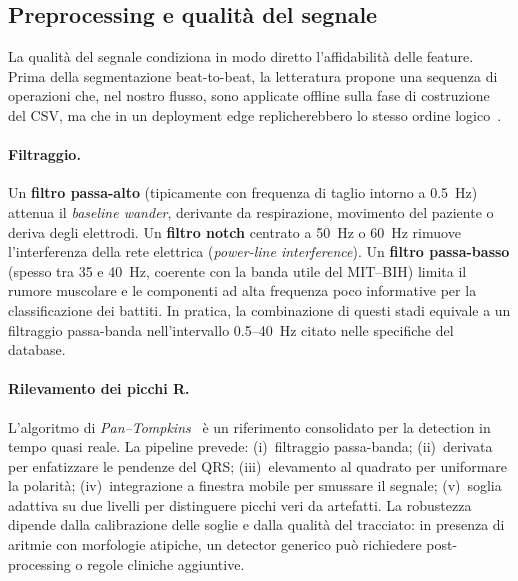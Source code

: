 \subsection{Preprocessing e qualità del segnale}\label{subsec:preprocessing}

La qualità del segnale condiziona in modo diretto l'affidabilità delle feature.
Prima della segmentazione beat-to-beat, la letteratura propone una sequenza di operazioni che, nel nostro flusso, sono applicate offline sulla fase di costruzione del CSV, ma che in un deployment edge replicherebbero lo stesso ordine logico~\cite{clifford2006advanced,pan1985realtime}.

\paragraph{Filtraggio.}
Un \textbf{filtro passa-alto} (tipicamente con frequenza di taglio intorno a 0.5~Hz) attenua il \emph{baseline wander}, derivante da respirazione, movimento del paziente o deriva degli elettrodi.
Un \textbf{filtro notch} centrato a 50~Hz o 60~Hz rimuove l'interferenza della rete elettrica (\emph{power-line interference}).
Un \textbf{filtro passa-basso} (spesso tra 35 e 40~Hz, coerente con la banda utile del MIT--BIH) limita il rumore muscolare e le componenti ad alta frequenza poco informative per la classificazione dei battiti.
In pratica, la combinazione di questi stadi equivale a un filtraggio passa-banda nell'intervallo 0.5--40~Hz citato nelle specifiche del database.

\paragraph{Rilevamento dei picchi R.}
L'algoritmo di \emph{Pan--Tompkins}~\cite{pan1985realtime} è un riferimento consolidato per la detection in tempo quasi reale.
La pipeline prevede: (i)~filtraggio passa-banda; (ii)~derivata per enfatizzare le pendenze del QRS; (iii)~elevamento al quadrato per uniformare la polarità; (iv)~integrazione a finestra mobile per smussare il segnale; (v)~soglia adattiva su due livelli per distinguere picchi veri da artefatti.
La robustezza dipende dalla calibrazione delle soglie e dalla qualità del tracciato: in presenza di aritmie con morfologie atipiche, un detector generico può richiedere post-processing o regole cliniche aggiuntive.

